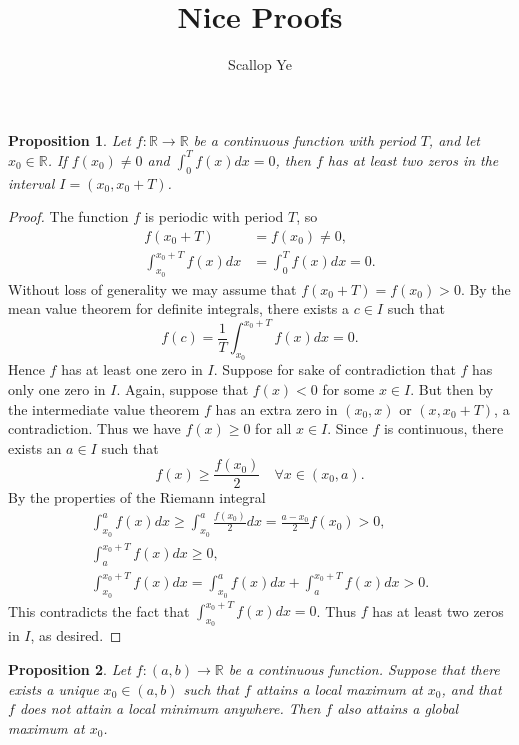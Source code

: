 \documentclass{amsart}
\title{Nice Proofs}
\author{Scallop Ye}
\newtheorem{proposition}{Proposition}
\begin{document}
\maketitle

\begin{proposition}
    Let $f:\mathbb{R}\to\mathbb{R}$ be a continuous function with period $T$, and let $x_0\in\mathbb{R}$.
    If $f(x_0)\neq0$ and $\int_{0}^{T}f(x)dx=0$, then $f$ has
    at least two zeros in the interval $I=(x_0,x_0+T)$.
\end{proposition}

\begin{proof}
    The function $f$ is periodic with period $T$, so
    \begin{align*}
        f(x_0+T)                 & =f(x_0)\neq0,          \\
        \int_{x_0}^{x_0+T}f(x)dx & =\int_{0}^{T}f(x)dx=0.
    \end{align*}
    Without loss of generality we may assume that $f(x_0+T)=f(x_0)>0$.
    By the mean value theorem for definite integrals, there exists a $c\in I$ such that
    \[f(c)=\frac{1}{T}\int_{x_0}^{x_0+T}f(x)dx=0.\]
    Hence $f$ has at least one zero in $I$. Suppose for sake of contradiction that
    $f$ has only one zero in $I$. Again, suppose that
    $f(x)<0$ for some $x\in I$. But then by the intermediate value theorem
    $f$ has an extra zero in $(x_0,x)$ or $(x,x_0+T)$, a contradiction. Thus we have $f(x)\ge0$ for all $x\in I$.
    Since $f$ is continuous, there exists an $a\in I$ such that
    \[f(x)\ge\frac{f(x_0)}{2}\quad\forall x\in(x_0,a).\]
    By the properties of the Riemann integral
    \begin{align*}
        \int_{x_0}^{a}f(x)dx\ge\int_{x_0}^{a}\frac{f(x_0)}{2}dx=\frac{a-x_0}{2}f(x_0)>0, \\
        \int_{a}^{x_0+T}f(x)dx\ge0,                                                      \\
        \int_{x_0}^{x_0+T}f(x)dx=\int_{x_0}^{a}f(x)dx+\int_{a}^{x_0+T}f(x)dx>0.
    \end{align*}
    This contradicts the fact that $\int_{x_0}^{x_0+T}f(x)dx=0$.
    Thus $f$ has at least two zeros in $I$, as desired.
\end{proof}

\begin{proposition}
    Let $f:(a,b)\to\mathbb{R}$ be a continuous function. Suppose that there exists a unique
    $x_0\in(a,b)$ such that $f$ attains a local maximum at $x_0$, and that $f$ does not
    attain a local minimum anywhere. Then $f$ also attains
    a global maximum at $x_0$.
\end{proposition}
\end{document}
